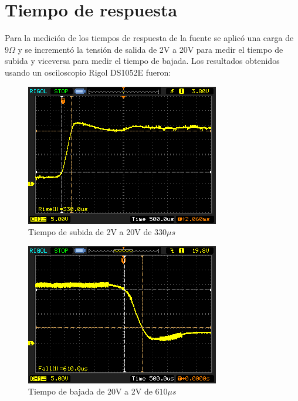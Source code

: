 \documentclass[12pt]{report}
\begin{document}
\section{Tiempo de respuesta}

Para la medición de los tiempos de respuesta de la fuente se aplicó una carga de $9\Omega$ y se incrementó la tensión de salida de 2V a 20V para medir el tiempo de subida y viceversa para medir el tiempo de bajada. Los resultados obtenidos usando un osciloscopio Rigol DS1052E fueron:

\begin{figure}[H]
	\centering
	\includegraphics[width=\textwidth,height=0.4\textheight,keepaspectratio]{rise-time}
	\caption{Tiempo de subida de 2V a 20V de 330$\mu s$}
\end{figure}

\begin{figure}[H]
	\centering
	\includegraphics[width=\textwidth,height=0.4\textheight,keepaspectratio]{fall-time}
	\caption{Tiempo de bajada de 20V a 2V de $610\mu s$}
\end{figure}
\end{document}
